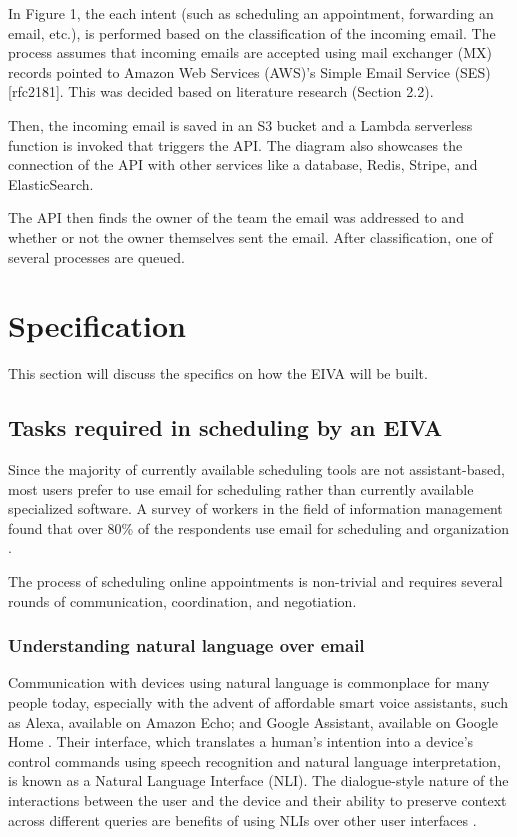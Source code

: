 \documentclass{article}
\begin{document}
In Figure 1, the each intent (such as scheduling an appointment, forwarding an email, etc.), is performed based on the classification of the incoming email. The process assumes that incoming emails are accepted using mail exchanger (MX) records pointed to Amazon Web Services (AWS)'s Simple Email Service (SES) [rfc2181]. This was decided based on literature research (Section 2.2).

Then, the incoming email is saved in an S3 bucket and a Lambda serverless function is invoked that triggers the API. The diagram also showcases the connection of the API with other services like a database, Redis, Stripe, and ElasticSearch.

The API then finds the owner of the team the email was addressed to and whether or not the owner themselves sent the email. After classification, one of several processes are queued.

\newpage

\section{Specification}

This section will discuss the specifics on how the EIVA will be built.

\subsection{Tasks required in scheduling by an EIVA}

Since the majority of currently available scheduling tools are not assistant-based, most users prefer to use email for scheduling rather than currently available specialized software. A survey of workers in the field of information management found that over 80\% of the respondents use email for scheduling and organization \cite{ducheneaut_e-mail_2001}.

The process of scheduling online appointments is non-trivial and requires several rounds of communication, coordination, and negotiation.

\subsubsection{Understanding natural language over email}

Communication with devices using natural language is commonplace for many people today, especially with the advent of affordable smart voice assistants, such as Alexa, available on Amazon Echo; and Google Assistant, available on Google Home \cite{de_barcelos_silva_intelligent_2020}. Their interface, which translates a human's intention into a device's control commands using speech recognition and natural language interpretation, is known as a Natural Language Interface (NLI). The dialogue-style nature of the interactions between the user and the device and their ability to preserve context across different queries are benefits of using NLIs over other user interfaces \cite{kiseleva_predicting_2016}.
\end{document}
